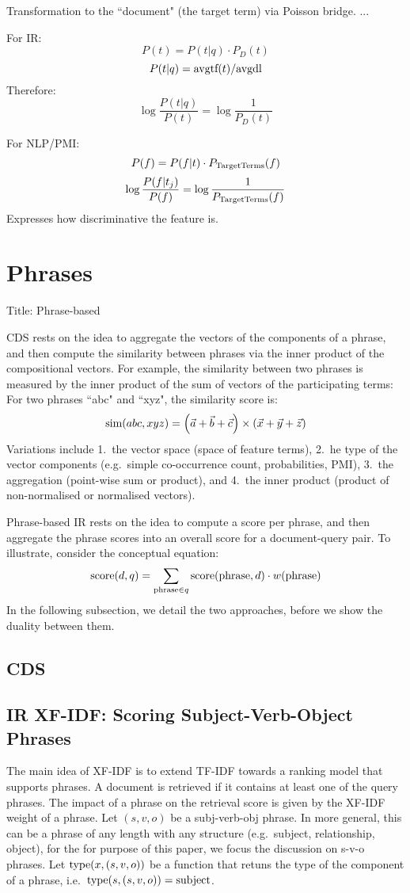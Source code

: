 Transformation to the ``document" (the target term) via Poisson bridge.
...

For IR:
\[
P(t) = P(t|q) \cdot P_D(t)
\]
\[
P(t|q) = \textmd{avgtf}(t) / \textmd{avgdl}
\]
Therefore:
\[
\log\frac{P(t|q)}{P(t)} = \log\frac{1}{P_D(t)}
\]

For NLP/PMI:
\[
P(f) = P(f|t) \cdot P_\textmd{TargetTerms}(f)
\]
\[
\log\frac{P(f|t_j)}{P(f)} = \log\frac{1}{P_\textmd{TargetTerms}(f)}
\]
Expresses how discriminative the feature is.




\section{Phrases}

Title: Phrase-based


CDS rests on the idea to aggregate the vectors of the components of a phrase,
and then compute the similarity between phrases via the inner product
of the compositional vectors.
For example, the similarity between two phrases is measured by
the inner product of the sum of vectors of the participating terms:
For two phrases ``abc" and ``xyz", the similarity score is:
\[
\textmd{sim}(abc,xyz)=
	\left(\vec{a} + \vec{b} + \vec{c}\right) \times
	\left(\vec{x} + \vec{y} + \vec{z}\right)
\]
Variations include
1.~the vector space (space of feature terms),
2.~he type of the vector components
(e.g.~simple co-occurrence count, probabilities, PMI),
3.~the aggregation (point-wise sum or product), and
4.~the inner product (product of non-normalised or normalised vectors).

Phrase-based IR rests on the idea to compute a score per phrase, and
then aggregate the phrase scores into an overall score for a document-query
pair.
To illustrate, consider the conceptual equation:
\[
\textmd{score}(d,q) =
	\sum_{\textmd{phrase} \in q}
	\textmd{score}(\textmd{phrase},d) \cdot w(\textmd{phrase})
\]
In the following subsection, we detail the two approaches, before we
show the duality between them.

\subsection{CDS}

\subsection{IR XF-IDF: Scoring Subject-Verb-Object Phrases}

The main idea of XF-IDF \cite{Azzam/etal:SIGMOD:KEYS:2010} is to extend
TF-IDF towards a ranking model that supports phrases.
%
A document is retrieved if it contains at least one of the query phrases.
%
The impact of a phrase on the retrieval score is given by the XF-IDF
weight of a phrase.
%
Let $(s,v,o)$ be a subj-verb-obj phrase.
In more general, this can be a phrase of any length with any structure
(e.g.~subject, relationship, object), for the for purpose of this paper,
we focus the discussion on s-v-o phrases.
%
Let $\textmd{type}(x,(s,v,o))$ be a function that retuns the type of the component
of a phrase, i.e.~$\textmd{type}(s,(s,v,o))=\textmd{subject}$.

